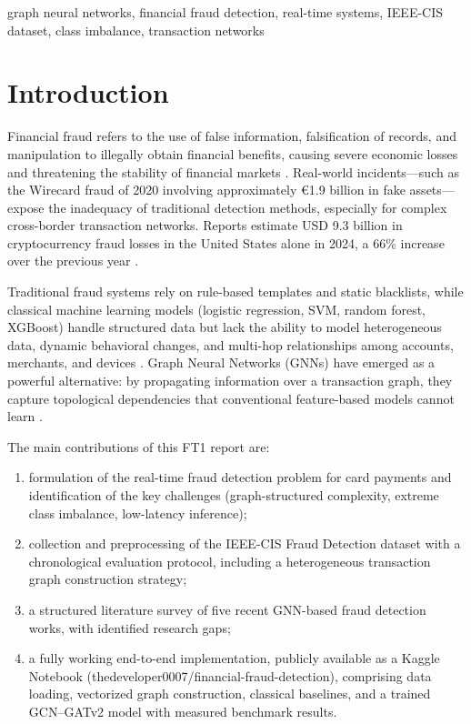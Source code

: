 \documentclass[conference]{IEEEtran}
\begin{document}
\begin{IEEEkeywords}
graph neural networks, financial fraud detection, real-time systems,
IEEE-CIS dataset, class imbalance, transaction networks
\end{IEEEkeywords}

\section{Introduction}
Financial fraud refers to the use of false information, falsification of
records, and manipulation to illegally obtain financial benefits, causing
severe economic losses and threatening the stability of financial markets
\cite{qian2025metapath}. Real-world incidents---such as the Wirecard fraud
of 2020 involving approximately \euro1.9 billion in fake assets---expose
the inadequacy of traditional detection methods, especially for complex
cross-border transaction networks. Reports estimate USD 9.3 billion in
cryptocurrency fraud losses in the United States alone in 2024, a 66\%
increase over the previous year \cite{wang2026cosemignn}.

Traditional fraud systems rely on rule-based templates and static
blacklists, while classical machine learning models (logistic regression,
SVM, random forest, XGBoost) handle structured data but lack the ability to
model heterogeneous data, dynamic behavioral changes, and multi-hop
relationships among accounts, merchants, and devices
\cite{qian2025metapath,hiremath2024ensemble}. Graph Neural Networks (GNNs)
have emerged as a powerful alternative: by propagating information over a
transaction graph, they capture topological dependencies that conventional
feature-based models cannot learn \cite{lu2025gnn}.

The main contributions of this FT1 report are:
\begin{enumerate}
  \item formulation of the real-time fraud detection problem for card
        payments and identification of the key challenges (graph-structured
        complexity, extreme class imbalance, low-latency inference);
  \item collection and preprocessing of the IEEE-CIS Fraud Detection
        dataset with a chronological evaluation protocol, including a
        heterogeneous transaction graph construction strategy;
  \item a structured literature survey of five recent GNN-based fraud
        detection works, with identified research gaps;
  \item a fully working end-to-end implementation, publicly available as
        a Kaggle Notebook (thedeveloper0007/financial-fraud-detection),
        comprising data loading, vectorized graph construction, classical
        baselines, and a trained GCN--GATv2 model with measured benchmark
        results.
\end{enumerate}
\end{document}
